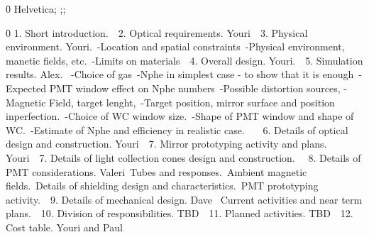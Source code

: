 {\mac{}
{\fonttbl\f0\fswiss{} Helvetica;}
{;;}
\pard{}\ql\qnatural

\f0  1. Short introduction.\
\
2. Optical requirements. Youri\
\
3. Physical environment. Youri.\
	-Location and spatial constraints\
	-Physical environment, manetic fields, etc.\
	-Limits on materials\
	\
4. Overall design. Youri.\
\
5. Simulation results. Alex.\
\pard{}\ql\qnatural\pardirnatural
{}     	-Choice of gas\
	-Nphe in simplest case - to show that it is enough\
	-Expected PMT window effect on Nphe numbers\
	-Possible distortion sources, - Magnetic Field, target lenght,\
	-Target position, mirror surface and position inperfection.\
	-Choice of WC window size.\
	-Shape of PMT window and shape of WC.\
	-Estimate of Nphe and efficiency in realistic case.\
\
\pard{}\ql\qnatural
\cf0 \
6. Details of optical design and construction. Youri\
\
7. Mirror prototyping activity and plans. Youri\
\
7. Details of light collection cones design and construction. \
\
8. Details of PMT considerations. Valeri\
	Tubes and responses.\
	Ambient magnetic fields.\
	Details of  shielding design and characteristics.\
	PMT prototyping activity.\
\
9. Details of mechanical design. Dave \
	Current activities and near term plans.\
\
10. Division of responsibilities. TBD\
\
11. Planned activities. TBD\
\
12. Cost table.  Youri and Paul\
}